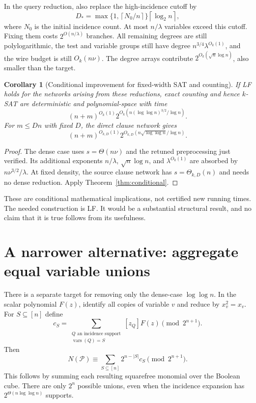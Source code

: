 \documentclass[11pt]{article}
\newtheorem{corollary}[theorem]{Corollary}
\theoremstyle{definition}
\theoremstyle{remark}
\newcommand{\ceil}[1]{\left\lceil #1\right\rceil}
\begin{document}
In the query reduction, also replace the high-incidence cutoff by
\begin{equation}\label{eq:cutoff}
 D_* =\max\{1,\ceil{N_0/n}\}\ceil{\log_2n},
\end{equation}
where $N_0$ is the initial incidence count. At most $n/\lambda$ variables
exceed this cutoff. Fixing them costs $2^{O(n/\lambda)}$ branches. All
remaining degrees are still polylogarithmic, the test and variable groups
still have degree $n^{3/4}\lambda^{O_k(1)}$, and the wire budget is still
$O_k(n\nu)$. The degree arrays contribute
$2^{O_k(\sqrt n\log n)}$, also smaller than the target.

\begin{corollary}[Conditional improvement for fixed-width SAT and counting]
\label{cor:conditional-sat}
If LF holds for the networks arising from these reductions, exact counting
and hence $k$-SAT are deterministic and polynomial-space with time
\[
 (n+m)^{O_k(1)}
 2^{O_k(n(\log\log n)^{3/2}/\log n)}.
\]
For $m\le Dn$ with fixed $D$, the direct clause network gives
\[
 (n+m)^{O_{k,D}(1)}
 2^{O_{k,D}(n\sqrt{\log\log n}/\log n)}.
\]
\end{corollary}
\begin{proof}
The dense case uses $s=\Theta(n\nu)$ and the retuned preprocessing just
verified. Its additional exponents $n/\lambda$, $\sqrt n\log n$, and
$\lambda^{O_k(1)}$ are absorbed by $n\nu^{3/2}/\lambda$. At fixed
density, the source clause network has $s=\Theta_{k,D}(n)$ and needs no
dense reduction. Apply Theorem~\ref{thm:conditional}.
\end{proof}

These are conditional mathematical implications, not certified new running
times. The needed construction is LF. It would be a substantial structural
result, and no claim that it is true follows from its usefulness.

\section{A narrower alternative: aggregate equal variable unions}\label{sec:union}

There is a separate target for removing only the dense-case $\log\log n$.
In the scalar polynomial $F(z)$, identify all copies of variable $v$ and
reduce by $x_v^2=x_v$. For $S\subseteq[n]$ define
\[
 c_S=\sum_{\substack{Q\text{ an incidence support}\\
                         \operatorname{vars}(Q)=S}}[z_Q]F(z)
                      \pmod{2^{n+1}}.
\]
Then
\begin{equation}\label{eq:union}
 N(\mathcal P)\equiv\sum_{S\subseteq[n]}2^{n-|S|}c_S
                          \pmod{2^{n+1}}.
\end{equation}
This follows by summing each resulting squarefree monomial over the Boolean
cube. There are only $2^n$ possible unions, even when the incidence expansion
has $2^{\Theta(n\log\log n)}$ supports.
\end{document}
